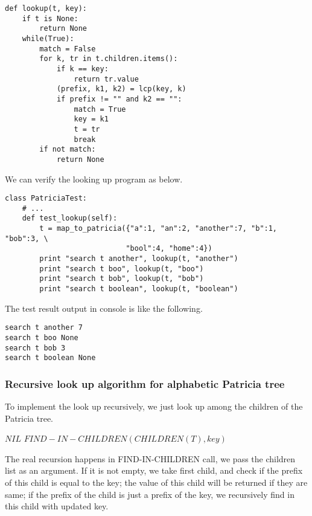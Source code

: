 \documentclass{article}
\begin{document}
\lstset{language=Python}
\begin{lstlisting}
def lookup(t, key):
    if t is None:
        return None
    while(True):
        match = False
        for k, tr in t.children.items():
            if k == key:
                return tr.value
            (prefix, k1, k2) = lcp(key, k)
            if prefix != "" and k2 == "":
                match = True
                key = k1
                t = tr
                break
        if not match:
            return None
\end{lstlisting}

We can verify the looking up program as below.

\begin{lstlisting}
class PatriciaTest:
    # ...
    def test_lookup(self):
        t = map_to_patricia({"a":1, "an":2, "another":7, "b":1, "bob":3, \
                            "bool":4, "home":4})
        print "search t another", lookup(t, "another")
        print "search t boo", lookup(t, "boo")
        print "search t bob", lookup(t, "bob")
        print "search t boolean", lookup(t, "boolean")
\end{lstlisting}

The test result output in console is like the following.

\begin{verbatim}
search t another 7
search t boo None
search t bob 3
search t boolean None
\end{verbatim}

\subsubsection{Recursive look up algorithm for alphabetic Patricia
tree}

To implement the look up recursively, we just look up among the children
of the Patricia tree.

\begin{algorithmic}[1]
    \State \Return $NIL$
  \Else
    \State \Return $FIND-IN-CHILDREN(CHILDREN(T), key)$
  \EndIf
\EndFunction
\end{algorithmic}

The real recursion happens in FIND-IN-CHILDREN call, we pass the
children list as an argument. If it is not empty, we take first child,
and check if the prefix of this child is equal to the key; the value
of this child will be returned if they are same; if the prefix of the
child is just a prefix of the key, we recursively find in this child
with updated key.
\end{document}
